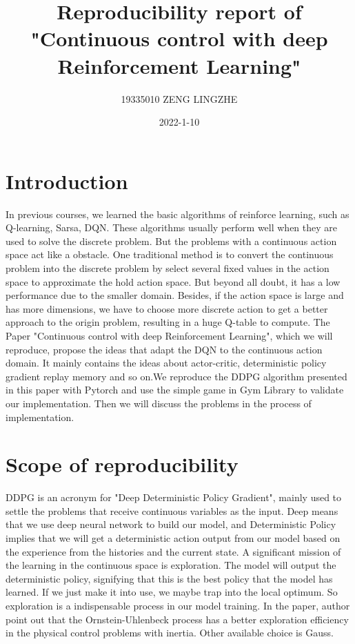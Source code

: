 \documentclass[a4paper,12pt,oneside,article]{memoir}
\begin{document}

\title {Reproducibility report of "Continuous control with deep Reinforcement Learning"}
\author{19335010   ZENG LINGZHE}
\date{2022-1-10}
\maketitle\thispagestyle{mypagestyle}

\chapter{Introduction}
In previous courses, we learned the basic algorithms of reinforce learning, such as Q-learning, Sarsa, DQN. These algorithms usually perform well when they are used to solve the discrete problem. But the problems with a continuous action space act like a obstacle. One traditional method is to convert the continuous problem into the discrete problem by select several fixed values in the action space to approximate the hold action space. But beyond all doubt, it has a low performance due to the smaller domain. Besides, if the action space is large and has more dimensions, we have to choose more discrete action to get a better approach to the origin problem, resulting in a huge Q-table to compute. The Paper "Continuous control with deep Reinforcement Learning", which we will reproduce, propose the ideas that adapt the DQN to the continuous action domain. It mainly contains the ideas about actor-critic, deterministic policy gradient replay memory and so on.We reproduce the DDPG algorithm presented in this paper with Pytorch and use the simple game in Gym Library to validate our implementation. Then we will discuss the problems in the process of implementation.

\chapter{Scope of reproducibility}
DDPG is an acronym for "Deep Deterministic Policy Gradient", mainly used to settle the problems that receive continuous variables as the input. Deep means that we use deep neural network to build our model, and Deterministic Policy implies that we will get a deterministic action output from our model based on the experience from the histories and the current state. A significant mission of the learning in the continuous space is exploration. The model will output the deterministic policy, signifying that this is the best policy that the model has learned. If we just make it into use, we maybe trap into the local optimum. So exploration is a indispensable process in our model training. In the paper, author point out that the Ornstein-Uhlenbeck process has a better exploration efficiency in the physical control problems with inertia. Other available choice is Gauss.
\end{document}
